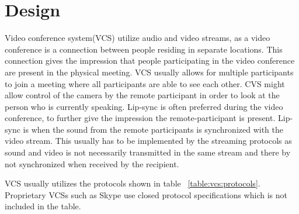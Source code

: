 \chapter{Design}

Video conference system(VCS) utilize audio and video streams, as a video conference is a connection between people residing in separate locations. This connection gives the impression that people participating in the video conference are present in the physical meeting. VCS usually allows for multiple participants to join a meeting where all participants are able to see each other. CVS might allow control of the camera by the remote participant in order to look at the person who is currently speaking. 
Lip-sync is often preferred during the video conference, to further give the impression the remote-participant is present. Lip-sync is when the sound from the remote participants is synchronized with the video stream. This usually has to be implemented by the streaming protocols as sound and video is not necessarily transmitted in the same stream and there by not synchronized when received by the recipient.


VCS usually utilizes the protocols shown in table ~\ref{table:vcs:protocols}. Proprietary VCSs such as Skype use closed protocol specifications which is not included in the table.


\begin{table}[]
	\centering
	\caption{Table showing protocols usually used in a video conference system.}
	\label{my-label}
\end{table}

